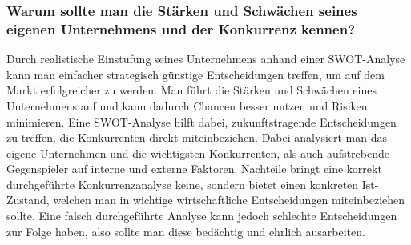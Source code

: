 \begin{refsection}
  
  \subsubsection*{Warum sollte man die Stärken und Schwächen seines eigenen Unternehmens und der Konkurrenz kennen?}
Durch realistische Einstufung seines Unternehmens anhand einer SWOT-Analyse kann man einfacher strategisch günstige Entscheidungen treffen, um auf dem Markt erfolgreicher zu werden.
Man führt die Stärken und Schwächen eines Unternehmens auf und kann dadurch Chancen besser nutzen und Risiken minimieren. Eine SWOT-Analyse hilft dabei, zukunftstragende Entscheidungen zu treffen, die Konkurrenten direkt miteinbeziehen.
Dabei analysiert man das eigene Unternehmen und die wichtigsten Konkurrenten, als auch aufstrebende Gegenspieler auf interne und externe Faktoren.
Nachteile bringt eine korrekt durchgeführte Konkurrenzanalyse keine, sondern bietet einen konkreten Ist-Zustand, welchen man in wichtige wirtschaftliche Entscheidungen miteinbeziehen sollte.
Eine falsch durchgeführte Analyse kann jedoch schlechte Entscheidungen zur Folge haben, also sollte man diese bedächtig und ehrlich ausarbeiten.

  \clearpage
  \printbibliography[heading=subsubbibliography]
\end{refsection}
\clearpage

